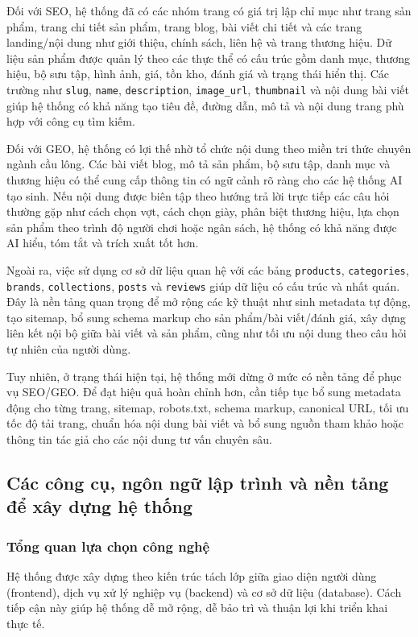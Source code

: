 \documentclass[13pt]{article}
\begin{document}
Đối với SEO, hệ thống đã có các nhóm trang có giá trị lập chỉ mục như trang sản phẩm, trang chi tiết sản phẩm, trang blog, bài viết chi tiết và các trang landing/nội dung như giới thiệu, chính sách, liên hệ và trang thương hiệu. Dữ liệu sản phẩm được quản lý theo các thực thể có cấu trúc gồm danh mục, thương hiệu, bộ sưu tập, hình ảnh, giá, tồn kho, đánh giá và trạng thái hiển thị. Các trường như \texttt{slug}, \texttt{name}, \texttt{description}, \texttt{image\_url}, \texttt{thumbnail} và nội dung bài viết giúp hệ thống có khả năng tạo tiêu đề, đường dẫn, mô tả và nội dung trang phù hợp với công cụ tìm kiếm.

Đối với GEO, hệ thống có lợi thế nhờ tổ chức nội dung theo miền tri thức chuyên ngành cầu lông. Các bài viết blog, mô tả sản phẩm, bộ sưu tập, danh mục và thương hiệu có thể cung cấp thông tin có ngữ cảnh rõ ràng cho các hệ thống AI tạo sinh. Nếu nội dung được biên tập theo hướng trả lời trực tiếp các câu hỏi thường gặp như cách chọn vợt, cách chọn giày, phân biệt thương hiệu, lựa chọn sản phẩm theo trình độ người chơi hoặc ngân sách, hệ thống có khả năng được AI hiểu, tóm tắt và trích xuất tốt hơn.

Ngoài ra, việc sử dụng cơ sở dữ liệu quan hệ với các bảng \texttt{products}, \texttt{categories}, \texttt{brands}, \texttt{collections}, \texttt{posts} và \texttt{reviews} giúp dữ liệu có cấu trúc và nhất quán. Đây là nền tảng quan trọng để mở rộng các kỹ thuật như sinh metadata tự động, tạo sitemap, bổ sung schema markup cho sản phẩm/bài viết/đánh giá, xây dựng liên kết nội bộ giữa bài viết và sản phẩm, cũng như tối ưu nội dung theo câu hỏi tự nhiên của người dùng.

Tuy nhiên, ở trạng thái hiện tại, hệ thống mới dừng ở mức có nền tảng để phục vụ SEO/GEO. Để đạt hiệu quả hoàn chỉnh hơn, cần tiếp tục bổ sung metadata động cho từng trang, sitemap, robots.txt, schema markup, canonical URL, tối ưu tốc độ tải trang, chuẩn hóa nội dung bài viết và bổ sung nguồn tham khảo hoặc thông tin tác giả cho các nội dung tư vấn chuyên sâu.


\subsection{Các công cụ, ngôn ngữ lập trình và nền tảng để xây dựng hệ thống}

\subsubsection{Tổng quan lựa chọn công nghệ}
Hệ thống được xây dựng theo kiến trúc tách lớp giữa giao diện người dùng (frontend),
dịch vụ xử lý nghiệp vụ (backend) và cơ sở dữ liệu (database). 
Cách tiếp cận này giúp hệ thống dễ mở rộng, dễ bảo trì và thuận lợi khi triển khai thực tế.
\end{document}
